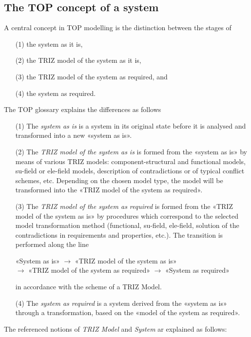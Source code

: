 \documentclass[11pt,a4paper]{article}
\begin{document}
\subsection{The TOP concept of a system}

A central concept in TOP modelling is the distinction between the stages of 
\begin{itemize}[noitemsep]
\item [(1)] the system as it is,
\item [(2)] the TRIZ model of the system as it is,
\item [(3)] the TRIZ model of the system as required, and 
\item [(4)] the system as required. 
\end{itemize}
The TOP glossary \cite{TOP-Glossary} explains the differences as follows
\begin{itemize}[noitemsep]
\item [(1)] The \emph{system as is} is a system in its original state before
  it is analysed and transformed into a new «system as is».
\item [(2)] The \emph{TRIZ model of the system as is} is formed from the
  «system as is» by means of various TRIZ models: component-structural and
  functional models, su-field or ele-field models, description of
  contradictions or of typical conflict schemes, etc. Depending on the chosen
  model type, the model will be transformed into the «TRIZ model of the system
  as required».
\item [(3)] The \emph{TRIZ model of the system as required} is formed from the
  «TRIZ model of the system as is» by procedures which correspond to the
  selected model transformation method (functional, su-field, ele-field,
  solution of the contradictions in requirements and properties, etc.). The
  transition is performed along the line
  \begin{center}
    «System as is» $\to$ «TRIZ model of the system as is»\\ $\to$ «TRIZ model
    of the system as required» $\to$ «System as required»
  \end{center}
  in accordance with the scheme of a TRIZ Model.
\item [(4)] The \emph{system as required} is a system derived from the «system
  as is» through a transformation, based on the «model of the system as
  required».
 \end{itemize}
The referenced notions of \emph{TRIZ Model} and \emph{System} ar explained as
follows:
\end{document}
